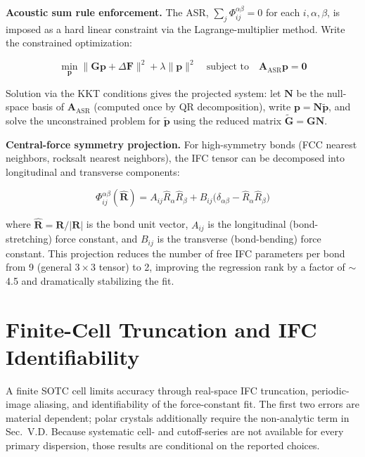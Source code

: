 \documentclass[aps,prb,reprint,amsmath,amssymb,floatfix]{revtex4-2}
\begin{document}
\textbf{Acoustic sum rule enforcement.} The ASR,
\(\sum_j\Phi_{ij}^{\alpha\beta} = 0\) for each \(i,\alpha,\beta\), is
imposed as a hard linear constraint via the Lagrange-multiplier method.
Write the constrained optimization:

\begin{equation*}
\min_\mathbf{p}\|\mathbf{G}\mathbf{p}+\Delta\mathbf{F}\|^2
+\lambda\|\mathbf{p}\|^2
\quad\text{subject to}\quad
\mathbf{A}_\text{ASR}\mathbf{p}=\mathbf{0}
\end{equation*}

Solution via the KKT conditions gives the projected system: let
\(\mathbf{N}\) be the null-space basis of \(\mathbf{A}_\text{ASR}\)
(computed once by QR decomposition), write
\(\mathbf{p} = \mathbf{N}\tilde{\mathbf{p}}\), and solve the
unconstrained problem for \(\tilde{\mathbf{p}}\) using the reduced
matrix \(\tilde{\mathbf{G}} = \mathbf{G}\mathbf{N}\).

\textbf{Central-force symmetry projection.} For high-symmetry bonds (FCC
nearest neighbors, rocksalt nearest neighbors), the IFC tensor can be
decomposed into longitudinal and transverse components:

\begin{equation*}
\Phi_{ij}^{\alpha\beta}(\hat{\mathbf{R}}) = A_{ij}\hat{R}_\alpha\hat{R}_\beta + B_{ij}\bigl(\delta_{\alpha\beta} - \hat{R}_\alpha\hat{R}_\beta\bigr)
\end{equation*}

where \(\hat{\mathbf{R}} = \mathbf{R}/|\mathbf{R}|\) is the bond unit
vector, \(A_{ij}\) is the longitudinal (bond-stretching) force constant,
and \(B_{ij}\) is the transverse (bond-bending) force constant. This
projection reduces the number of free IFC parameters per bond from 9
(general \(3\times3\) tensor) to 2, improving the regression rank by a
factor of $\sim$4.5 and dramatically stabilizing the fit.

\section{Finite-Cell Truncation and IFC Identifiability}
\label{appendix-e-finite-cell-truncation-and-ifc-identifiability}

A finite SOTC cell limits accuracy through real-space IFC truncation,
periodic-image aliasing, and identifiability of the force-constant fit. The
first two errors are material dependent; polar crystals additionally require
the non-analytic term in Sec.~V.D. Because systematic cell- and cutoff-series
are not available for every primary dispersion, those results are conditional
on the reported choices.
\end{document}
